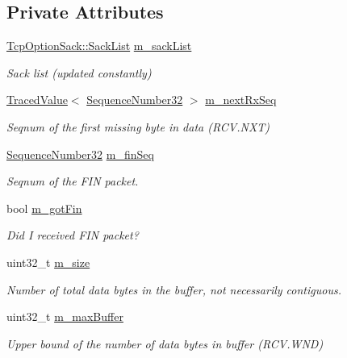 \subsection*{Private Attributes}
\begin{DoxyCompactItemize}
\item 
\hyperlink{classns3_1_1TcpOptionSack_a2aa2d721c71424680d79ebaa079f264a}{Tcp\+Option\+Sack\+::\+Sack\+List} \hyperlink{classns3_1_1TcpRxBuffer_aee4aac20f3e96f9108918d3650e58eb9}{m\+\_\+sack\+List}
\begin{DoxyCompactList}\small\item\em Sack list (updated constantly) \end{DoxyCompactList}\item 
\hyperlink{classns3_1_1TracedValue}{Traced\+Value}$<$ \hyperlink{group__network_gacb2070e4e98d2d5135c9bede58f07a03}{Sequence\+Number32} $>$ \hyperlink{classns3_1_1TcpRxBuffer_ab4390502dee7085dad4f7c3f9ef8796b}{m\+\_\+next\+Rx\+Seq}
\begin{DoxyCompactList}\small\item\em Seqnum of the first missing byte in data (R\+C\+V.\+N\+XT) \end{DoxyCompactList}\item 
\hyperlink{group__network_gacb2070e4e98d2d5135c9bede58f07a03}{Sequence\+Number32} \hyperlink{classns3_1_1TcpRxBuffer_a6f63b30eaef4dfcd219cbb9b31fc1a9d}{m\+\_\+fin\+Seq}
\begin{DoxyCompactList}\small\item\em Seqnum of the F\+IN packet. \end{DoxyCompactList}\item 
bool \hyperlink{classns3_1_1TcpRxBuffer_ad87a9d034dcc4150cacb5ec45c1883ae}{m\+\_\+got\+Fin}
\begin{DoxyCompactList}\small\item\em Did I received F\+IN packet? \end{DoxyCompactList}\item 
uint32\+\_\+t \hyperlink{classns3_1_1TcpRxBuffer_ad76a9d93027823422039c92e85d5d4ea}{m\+\_\+size}
\begin{DoxyCompactList}\small\item\em Number of total data bytes in the buffer, not necessarily contiguous. \end{DoxyCompactList}\item 
uint32\+\_\+t \hyperlink{classns3_1_1TcpRxBuffer_a9889bd68e8bf6b250e0ee363ab30f457}{m\+\_\+max\+Buffer}
\begin{DoxyCompactList}\small\item\em Upper bound of the number of data bytes in buffer (R\+C\+V.\+W\+ND) \end{DoxyCompactList}\item 

\end{DoxyCompactItemize}
